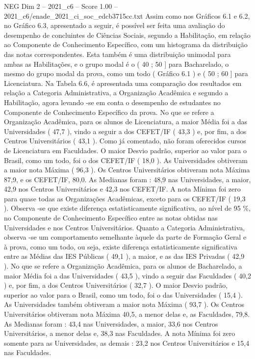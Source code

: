 \begin{textsample}{NEG Dim 2 – 2021\_c6 – Score 1.00 – 2021\_c6/enade\_2021\_ci\_soc\_edcb3715cc.txt}
Assim como nos Gráficos 6.1 e 6.2, no Gráfico 6.3, apresentado a seguir, é possível ser feita uma avaliação do desempenho de concluintes de Ciências Sociais, segundo a Habilitação, em relação ao Componente de Conhecimento Específico, com um histograma da distribuição das notas correspondentes.
Esta também é uma distribuição unimodal para ambas as Habilitações, e o grupo modal é o ( 40 ; 50 ] para Bacharelado, o mesmo do grupo modal da prova, como um todo ( Gráfico 6.1 ) e ( 50 ; 60 ] para Licenciatura.
Na Tabela 6.6, é apresentada uma comparação dos resultados em relação a Categoria Administrativa, a Organização Acadêmica e segundo a Habilitação, agora levando -se em conta o desempenho de estudantes no Componente de Conhecimento Específico da prova.
No que se refere a Organização Acadêmica, para os alunos de Licenciatura, a maior Média foi a das Universidades ( 47,7 ), vindo a seguir a dos CEFET/IF ( 43,3 ) e, por fim, a dos Centros Universitários ( 43,1 ).
Como já comentado, não foram oferecidos cursos de Licenciatura em Faculdades.
O maior Desvio padrão, superior ao valor para o Brasil, como um todo, foi o dos CEFET/IF ( 18,0 ).
As Universidades obtiveram a maior nota Máxima ( 96,3 ).
Os Centros Universitários obtiveram nota Máxima 87,9, e os CEFET/IF, 80,0.
As Medianas foram : 48,9 nas Universidades, a maior, 42,9 nos Centros Universitários e 42,3 nos CEFET/IF.
A nota Mínima foi zero para quase todas as Organizações Acadêmicas, exceto para os CEFET/IF ( 19,3 ).
Observa -se que existe diferença estatisticamente significativa, ao nível de 95 \%, no Componente de Conhecimento Específico entre as notas obtidas nas Universidades e nos Centros Universitários.
Quanto a Categoria Administrativa, observa -se um comportamento semelhante àquele da parte de Formação Geral e à prova, como um todo, ou seja, existe diferença estatisticamente significativa entre as Médias das IES Públicas ( 49,1 ), a maior, e as das IES Privadas ( 42,9 ).
No que se refere a Organização Acadêmica, para os alunos de Bacharelado, a maior Média foi a das Universidades ( 43,5 ), vindo a seguir das Faculdades ( 40,2 ) e, por fim, a dos Centros Universitários ( 32,7 ).
O maior Desvio padrão, superior ao valor para o Brasil, como um todo, foi o das Universidades ( 15,4 ).
As Universidades também obtiveram a maior nota Máxima ( 93,7 ).
Os Centros Universitários obtiveram nota Máxima 40,5, a menor delas e, as Faculdades, 79,8.
As Medianas foram : 43,4 nas Universidades, a maior, 33,6 nos Centros Universitários, a menor delas e, 38,3 nas Faculdades.
A nota Mínima foi zero somente para as Universidades, as demais : 23,2 nos Centros Universitários e 15,4 nas Faculdades.

\end{textsample}

